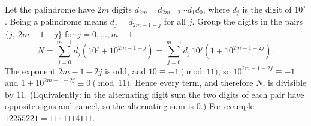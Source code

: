 Let the palindrome have $2m$ digits $d_{2m-1}d_{2m-2}\cdots d_1d_0$, where $d_j$ is the digit of $10^j$. Being a palindrome means $d_j=d_{2m-1-j}$ for all $j$. Group the digits in the pairs $\{j,\ 2m-1-j\}$ for $j=0,\dots,m-1$:
\[
N=\sum_{j=0}^{m-1}d_j\left(10^j+10^{2m-1-j}\right)=\sum_{j=0}^{m-1}d_j\,10^j\left(1+10^{2m-1-2j}\right).
\]
The exponent $2m-1-2j$ is odd, and $10\equiv-1\pmod{11}$, so $10^{2m-1-2j}\equiv-1$ and $1+10^{2m-1-2j}\equiv0\pmod{11}$. Hence every term, and therefore $N$, is divisible by $11$. (Equivalently: in the alternating digit sum the two digits of each pair have opposite signs and cancel, so the alternating sum is $0$.) For example $12255221=11\cdot1114111$.
